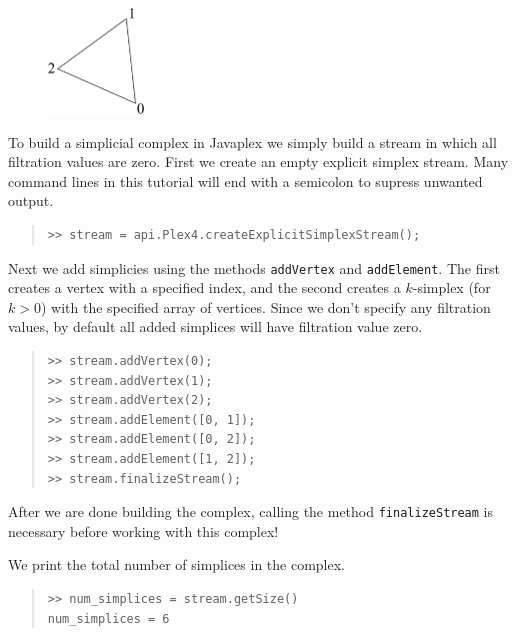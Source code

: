 \documentclass[amscd, amssymb, verbatim]{amsart}[12pt]
\theoremstyle{remark}
\theoremstyle{remark}
\theoremstyle{remark}
\begin{document}
\begin{figure}[htp]
  	\begin{center}
    	\includegraphics[width=1in]{s1.pdf}
   	\end{center}
\end{figure}
\FloatBarrier

To build a simplicial complex in Javaplex we simply build a stream in which all filtration values are zero. First we create an empty explicit simplex stream. Many command lines in this tutorial will end with a semicolon to supress unwanted output.

\begin{quote} \begin{verbatim} 
>> stream = api.Plex4.createExplicitSimplexStream();
\end{verbatim} \end{quote}

Next we add simplicies using the methods \texttt{addVertex} and \texttt{addElement}. The first creates a vertex with a specified index, and the second creates a $k$-simplex (for $k >0$) with the specified array of vertices. Since we don't specify any filtration values, by default all added simplices will have filtration value zero.

\begin{quote} \begin{verbatim}
>> stream.addVertex(0);
>> stream.addVertex(1);
>> stream.addVertex(2);
>> stream.addElement([0, 1]);
>> stream.addElement([0, 2]);
>> stream.addElement([1, 2]);
>> stream.finalizeStream();
\end{verbatim} \end{quote}

After we are done building the complex, calling the method \texttt{finalizeStream} is necessary before working with this complex!

We print the total number of simplices in the complex.

\begin{quote} \begin{verbatim}
>> num_simplices = stream.getSize()
num_simplices = 6
\end{verbatim} \end{quote}
\end{document}
